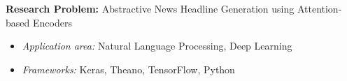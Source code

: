 \par{\textbf{Research Problem:} Abstractive News Headline Generation using Attention-based Encoders\vspace{0.5em}
\begin{itemize}
  \item \textit{Application area:} Natural Language Processing, Deep Learning\\
  \item \textit{Frameworks:} Keras, Theano, TensorFlow, Python
\end{itemize}
}

